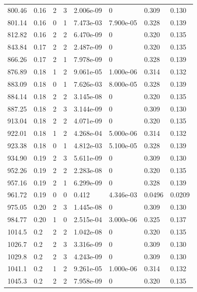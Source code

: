 \documentclass[preview]{standalone}
\begin{document}
{{{\begin{tabular}{L{1.2cm}C{1.2cm} C{0.3cm}C{0.5cm} C{1.4cm}C{1.4cm} C{1.4cm}C{1.4cm}}
  800.46  &  0.16  & 2     &  3 &  2.006e-09  & 0  & 0.309 &  0.130   \\ 
  801.14  &  0.16  & 0     &  1 &  7.473e-03  & 7.900e-05  & 0.328 &  0.139   \\ 
  812.82  &  0.16  & 2     &  2 &  6.470e-09  & 0  & 0.320 &  0.135   \\ 
  843.84  &  0.17  & 2     &  2 &  2.487e-09  & 0  & 0.320 &  0.135   \\ 
  866.26  &  0.17  & 2     &  1 &  7.978e-09  & 0  & 0.328 &  0.139   \\ 
  876.89  &  0.18  & 1     &  2 &  9.061e-05  & 1.000e-06  & 0.314 &  0.132   \\ 
  883.09  &  0.18  & 0     &  1 &  7.626e-03  & 8.000e-05  & 0.328 &  0.139   \\ 
  884.14  &  0.18  & 2     &  2 &  3.145e-08  & 0  & 0.320 &  0.135   \\ 
  887.25  &  0.18  & 2     &  3 &  3.144e-09  & 0  & 0.309 &  0.130   \\ 
  913.04  &  0.18  & 2     &  2 &  4.071e-09  & 0  & 0.320 &  0.135   \\ 
  922.01  &  0.18  & 1     &  2 &  4.268e-04  & 5.000e-06  & 0.314 &  0.132   \\ 
  923.38  &  0.18  & 0     &  1 &  4.812e-03  & 5.100e-05  & 0.328 &  0.139   \\ 
  934.90  &  0.19  & 2     &  3 &  5.611e-09  & 0  & 0.309 &  0.130   \\ 
  952.26  &  0.19  & 2     &  2 &  2.283e-08  & 0  & 0.320 &  0.135   \\ 
  957.16  &  0.19  & 2     &  1 &  6.299e-09  & 0  & 0.328 &  0.139   \\ 
  961.72  &  0.19  & 0     &  0 &  0.412  & 4.346e-03  & 0.0496 &  0.0209   \\ 
  975.05  &  0.20  & 2     &  3 &  1.445e-08  & 0  & 0.309 &  0.130   \\ 
  984.77  &  0.20  & 1     &  0 &  2.515e-04  & 3.000e-06  & 0.325 &  0.137   \\ 
  1014.5  &   0.2  & 2     &  2 &  1.042e-08  & 0  & 0.320 &  0.135   \\ 
  1026.7  &   0.2  & 2     &  3 &  3.316e-09  & 0  & 0.309 &  0.130   \\ 
  1029.8  &   0.2  & 2     &  3 &  4.243e-09  & 0  & 0.309 &  0.130   \\ 
  1041.1  &   0.2  & 1     &  2 &  9.261e-05  & 1.000e-06  & 0.314 &  0.132   \\ 
  1045.3  &   0.2  & 2     &  2 &  7.958e-09  & 0  & 0.320 &  0.135   \\ 

\end{tabular}}}}
\end{document}
